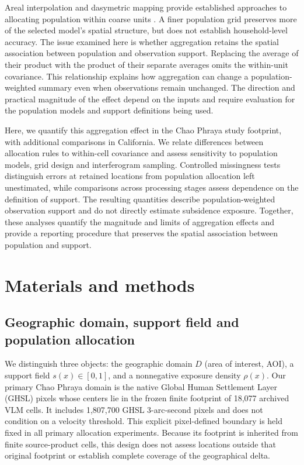 \documentclass[pdflatex,lineno,sn-nature]{sn-jnl}
\begin{document}
Areal interpolation and dasymetric mapping provide established approaches to allocating population within coarse units \citep{eicher2001dasymetric,mennis2003population}. A finer population grid preserves more of the selected model's spatial structure, but does not establish household-level accuracy. The issue examined here is whether aggregation retains the spatial association between population and observation support. Replacing the average of their product with the product of their separate averages omits the within-unit covariance. This relationship explains how aggregation can change a population-weighted summary even when observations remain unchanged. The direction and practical magnitude of the effect depend on the inputs and require evaluation for the population models and support definitions being used.

Here, we quantify this aggregation effect in the Chao Phraya study footprint, with additional comparisons in California. We relate differences between allocation rules to within-cell covariance and assess sensitivity to population models, grid design and interferogram sampling. Controlled missingness tests distinguish errors at retained locations from population allocation left unestimated, while comparisons across processing stages assess dependence on the definition of support. The resulting quantities describe population-weighted observation support and do not directly estimate subsidence exposure. Together, these analyses quantify the magnitude and limits of aggregation effects and provide a reporting procedure that preserves the spatial association between population and support.

\section{Materials and methods}
\subsection{Geographic domain, support field and population allocation}
We distinguish three objects: the geographic domain $D$ (area of interest, AOI), a support field $s(x)\in[0,1]$, and a nonnegative exposure density $\rho(x)$. Our primary Chao Phraya domain is the native Global Human Settlement Layer (GHSL) pixels whose centers lie in the frozen finite footprint of 18,077 archived VLM cells. It includes 1,807,700 GHSL 3-arc-second pixels and does not condition on a velocity threshold. This explicit pixel-defined boundary is held fixed in all primary allocation experiments. Because its footprint is inherited from finite source-product cells, this design does not assess locations outside that original footprint or establish complete coverage of the geographical delta.
\end{document}
